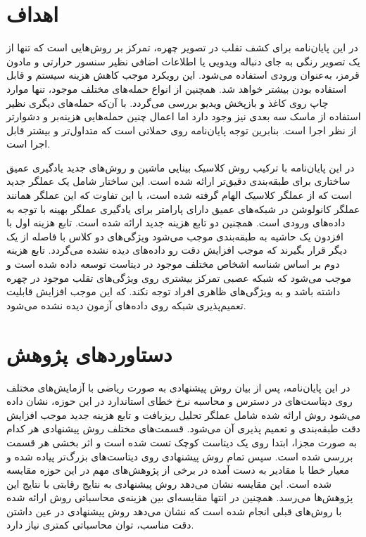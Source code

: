 \section{اهداف}
در این پایان‌نامه برای کشف تقلب در تصویر چهره، تمرکز بر روش‌هایی است که تنها از یک تصویر رنگی به جای دنباله ویدویی یا اطلاعات اضافی نظیر سنسور حرارتی و مادون قرمز، به‌عنوان ورودی استفاده می‌شود. این رویکرد موجب کاهش هزینه سیستم و قابل استفاده بودن بیشتر خواهد شد. همچنین از انواع حمله‌های مختلف موجود، تنها موارد چاپ روی کاغذ و بازپخش ویدیو بررسی می‌گردد. با آن‌که حمله‌های دیگری نظیر استفاده از ماسک سه بعدی نیز وجود دارد اما اعمال چنین حمله‌هایی هزینه‌بر و دشوارتر از نظر اجرا است. بنابرین توجه پایان‌نامه روی حملاتی است که متداول‌تر و بیشتر قابل اجرا است. 

در این پایان‌نامه با ترکیب روش کلاسیک بینایی ماشین و روش‌های جدید یادگیری عمیق ساختاری برای طبقه‌بندی دقیق‌تر ارائه شده است. این ساختار شامل یک عملگر جدید است که از عملگر  کلاسیک الهام گرفته شده است، با این تفاوت که این عملگر همانند عملگر کانولوشن در شبکه‌های عمیق دارای پارامتر برای یادگیری عملگر بهینه با توجه به داده‌های ورودی است. 
همچنین دو تابع هزینه جدید ارائه شده است. تابع هزینه اول با افزدون یک حاشیه به طبقه‌بندی موجب می‌شود ویژگی‌های دو کلاس با فاصله از یک دیگر قرار بگیرند که موجب افزایش دقت رو داده‌های دیده نشده می‌گردد. تابع هزینه دوم بر اساس شناسه اشخاص مختلف موجود در دیتاست توسعه داده شده است و موجب می‌شود که شبکه عصبی تمرکز بیشتری روی ویژگی‌های تقلب موجود در چهره داشته باشد و به ویژگی‌های ظاهری افراد توجه نکند. که این موجب افزایش قابلیت تعمیم‌پذیری شبکه روی داده‌های آزمون دیده نشده می‌شود.
\section{دستاورد‌های پژوهش}
در این پایان‌نامه، پس از بیان روش پیشنهادی به صورت ریاضی با آزمایش‌های مختلف روی دیتاست‌های در دسترس و محاسبه نرخ خطای استاندارد در این حوزه، نشان داده می‌شود روش ارائه شده شامل عملگر تحلیل ریزبافت و تابع هزینه جدید موجب افزایش دقت طبقه‌بندی و تعمیم پذیری آن می‌شود. قسمت‌های مختلف روش پیشنهادی هر کدام به صورت مجزا، ابتدا روی یک دیتاست کوچک تست شده است و اثر بخشی هر قسمت بررسی شده است. سپس تمام روش پیشنهادی روی دیتاست‌های بزرگ‌تر پیاده شده و معیار خطا با مقادیر به دست آمده در برخی از پژوهش‌های مهم در این حوزه مقایسه شده است. این مقایسه نشان می‌دهد روش پیشنهادی به نتایج رقابتی با نتایج این پژوهش‌ها می‌رسد. همچنین در انتها مقایسه‌ای بین هزینه‌ی محاسباتی روش ارائه شده با روش‌های قبلی انجام شده است که نشان می‌دهد روش پیشنهادی در عین داشتن دقت مناسب، توان محاسباتی کمتری نیاز دارد.


